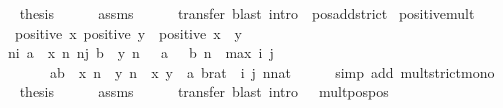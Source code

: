 \begin{isabellebody}
\ \ \isamarkupfalse%
\ {\isacharquery}{\kern0pt}thesis\isanewline
\ \ \ \ \isamarkupfalse%
\ assms\isanewline
\ \ \ \ \isamarkupfalse%
\ transfer\ {\isacharparenleft}{\kern0pt}blast\ intro{\isacharcolon}{\kern0pt}\ {\isacharasterisk}{\kern0pt}\ pos{\isacharunderscore}{\kern0pt}add{\isacharunderscore}{\kern0pt}strict{\isacharparenright}{\kern0pt}\isanewline
{}\isamarkupfalse%
%
\endisatagproof
{\isafoldproof}%
%
\isadelimproof
\isanewline
%
\endisadelimproof
\isanewline
{}\isamarkupfalse%
\ positive{\isacharunderscore}{\kern0pt}mult{\isacharcolon}{\kern0pt}\ \isanewline
\ \ \ {\isachardoublequoteopen}positive\ x{\isachardoublequoteclose}\ {\isachardoublequoteopen}positive\ y{\isachardoublequoteclose}\ \ {\isachardoublequoteopen}positive\ {\isacharparenleft}{\kern0pt}x\ {\isacharasterisk}{\kern0pt}\ y{\isacharparenright}{\kern0pt}{\isachardoublequoteclose}\isanewline
%
\isadelimproof
%
\endisadelimproof
%
\isatagproof
{}\isamarkupfalse%
\ {\isacharminus}{\kern0pt}\isanewline
\ \ \isamarkupfalse%
\ {\isacharasterisk}{\kern0pt}{\isacharcolon}{\kern0pt}\ {\isachardoublequoteopen}{\isasymlbrakk}{\isasymforall}n{\isasymge}i{\isachardot}{\kern0pt}\ a\ {\isacharless}{\kern0pt}\ x\ n{\isacharsemicolon}{\kern0pt}\ {\isasymforall}n{\isasymge}j{\isachardot}{\kern0pt}\ b\ {\isacharless}{\kern0pt}\ y\ n{\isacharsemicolon}{\kern0pt}\ {}\ {\isacharless}{\kern0pt}\ a{\isacharsemicolon}{\kern0pt}\ {}\ {\isacharless}{\kern0pt}\ b{\isacharsemicolon}{\kern0pt}\ n\ {\isasymge}\ max\ i\ j{\isasymrbrakk}\isanewline
\ \ \ \ \ \ \ {\isasymLongrightarrow}\ a{\isacharasterisk}{\kern0pt}b\ {\isacharless}{\kern0pt}\ x\ n\ {\isacharasterisk}{\kern0pt}\ y\ n{\isachardoublequoteclose}\ \ x\ y\ \ a\ b{\isacharcolon}{\kern0pt}{\isacharcolon}{\kern0pt}rat\ \ i\ j\ n{\isacharcolon}{\kern0pt}{\isacharcolon}{\kern0pt}nat\isanewline
\ \ \ \ \isamarkupfalse%
\ {\isacharparenleft}{\kern0pt}simp\ add{\isacharcolon}{\kern0pt}\ mult{\isacharunderscore}{\kern0pt}strict{\isacharunderscore}{\kern0pt}mono{\isacharprime}{\kern0pt}{\isacharparenright}{\kern0pt}\isanewline
\ \ \isamarkupfalse%
\ {\isacharquery}{\kern0pt}thesis\isanewline
\ \ \ \ \isamarkupfalse%
\ assms\isanewline
\ \ \ \ \isamarkupfalse%
\ transfer\ {\isacharparenleft}{\kern0pt}blast\ intro{\isacharcolon}{\kern0pt}\ {\isacharasterisk}{\kern0pt}\ \ mult{\isacharunderscore}{\kern0pt}pos{\isacharunderscore}{\kern0pt}pos{\isacharparenright}{\kern0pt}\isanewline

\end{isabellebody}
